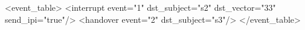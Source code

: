 <event_table>
    <interrupt event="1" dst_subject="s2" dst_vector="33" send_ipi="true"/>
    <handover  event="2" dst_subject="s3"/>
</event_table>
